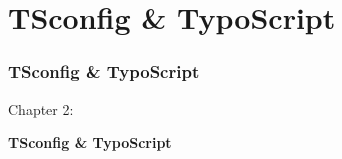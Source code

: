 %

\section{TSconfig \& TypoScript}
\begin{frame}[fragile]
	\frametitle{TSconfig \& TypoScript}

	\begin{center}\huge{Chapter 2:}\end{center}
	\begin{center}\huge{\color{typo3darkgrey}\textbf{TSconfig \& TypoScript}}\end{center}

\end{frame}

